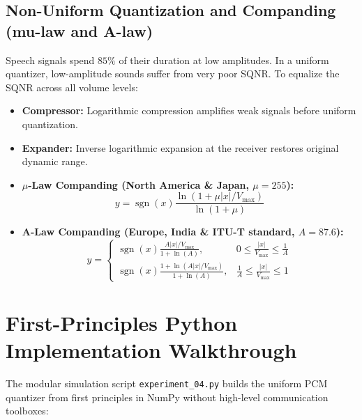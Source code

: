 \documentclass[11pt,a4paper]{article}
\begin{document}
\subsection{Non-Uniform Quantization and Companding (mu-law and A-law)}
Speech signals spend $85\%$ of their duration at low amplitudes. In a uniform quantizer, low-amplitude sounds suffer from very poor SQNR. To equalize the SQNR across all volume levels:
\begin{itemize}
    \item \textbf{Compressor:} Logarithmic compression amplifies weak signals before uniform quantization.
    \item \textbf{Expander:} Inverse logarithmic expansion at the receiver restores original dynamic range.
    \item \textbf{$\mu$-Law Companding (North America \& Japan, $\mu = 255$):}
    \begin{equation}
    y = \operatorname{sgn}(x) \frac{\ln(1 + \mu |x| / V_{\max})}{\ln(1 + \mu)}
    \end{equation}
    \item \textbf{A-Law Companding (Europe, India \& ITU-T standard, $A = 87.6$):}
    \begin{equation}
    y = \begin{cases} \operatorname{sgn}(x) \frac{A |x| / V_{\max}}{1 + \ln(A)}, & 0 \le \frac{|x|}{V_{\max}} \le \frac{1}{A} \\ \operatorname{sgn}(x) \frac{1 + \ln(A |x| / V_{\max})}{1 + \ln(A)}, & \frac{1}{A} \le \frac{|x|}{V_{\max}} \le 1 \end{cases}
    \end{equation}
\end{itemize}

\newpage

\section{First-Principles Python Implementation Walkthrough}
The modular simulation script \texttt{experiment\_04.py} builds the uniform PCM quantizer from first principles in NumPy without high-level communication toolboxes:
\end{document}
